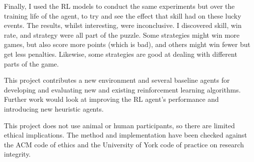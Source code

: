\documentclass[../main.tex]{subfiles}
\begin{document}
\begin{summary}
Finally, I used the RL models to conduct the same experiments but over the training life of the agent, to try and see the effect that skill had on these lucky events. The results, whilst interesting, were inconclusive. I discovered skill, win rate, and strategy were all part of the puzzle. Some strategies might win more games, but also score more points (which is bad), and others might win fewer but get less penalties. Likewise, some strategies are good at dealing with different parts of the game.


This project contributes a new environment and several baseline agents for developing and evaluating new and existing reinforcement learning algorithms. Further work would look at improving the RL agent's performance and introducing new heuristic agents. 

This project does not use animal or human participants, so there are limited ethical implications. The method and implementation have been checked against the ACM code of ethics and the University of York code of practice on research integrity. 

\end{summary}
\end{document}
